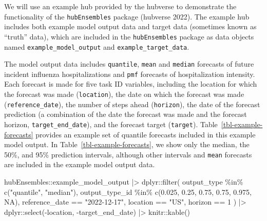 \documentclass[
]{article}
\newenvironment{Shaded}{\begin{snugshade}}{\end{snugshade}}
\newcommand{\ConstantTok}[1]{\textcolor[rgb]{0.56,0.35,0.01}{#1}}
\newcommand{\DecValTok}[1]{\textcolor[rgb]{0.68,0.00,0.00}{#1}}
\newcommand{\FloatTok}[1]{\textcolor[rgb]{0.68,0.00,0.00}{#1}}
\newcommand{\FunctionTok}[1]{\textcolor[rgb]{0.28,0.35,0.67}{#1}}
\newcommand{\NormalTok}[1]{\textcolor[rgb]{0.00,0.23,0.31}{#1}}
\newcommand{\SpecialCharTok}[1]{\textcolor[rgb]{0.37,0.37,0.37}{#1}}
\newcommand{\StringTok}[1]{\textcolor[rgb]{0.13,0.47,0.30}{#1}}
\begin{document}
We will use an example hub provided by the hubverse to demonstrate the
functionality of the \texttt{hubEnsembles} package (hubverse 2022). The
example hub includes both example model output data and target data
(sometimes known as ``truth'' data), which are included in the
\texttt{hubEnsembles} package as data objects named
\texttt{example\_model\_output} and \texttt{example\_target\_data}.

The model output data includes \texttt{quantile}, \texttt{mean} and
\texttt{median} forecasts of future incident influenza hospitalizations
and \texttt{pmf} forecasts of hospitalization intensity. Each forecast
is made for five task ID variables, including the location for which the
forecast was made (\texttt{location}), the date on which the forecast
was made (\texttt{reference\_date}), the number of steps ahead
(\texttt{horizon}), the date of the forecast prediction (a combination
of the date the forecast was made and the forecast horizon,
\texttt{target\_end\_date}), and the forecast target (\texttt{target}).
Table~\ref{tbl-example-forecasts} provides an example set of quantile
forecasts included in this example model output. In
Table~\ref{tbl-example-forecasts}, we show only the median, the 50\%,
and 95\% prediction intervals, although other intervals and
\texttt{mean} forecasts are included in the example model output data.

\begin{Shaded}
\begin{Highlighting}[]
\NormalTok{hubEnsembles}\SpecialCharTok{::}\NormalTok{example\_model\_output }\SpecialCharTok{|\textgreater{}}
\NormalTok{  dplyr}\SpecialCharTok{::}\FunctionTok{filter}\NormalTok{(}
\NormalTok{    output\_type }\SpecialCharTok{\%in\%} \FunctionTok{c}\NormalTok{(}\StringTok{"quantile"}\NormalTok{, }\StringTok{"median"}\NormalTok{),}
\NormalTok{    output\_type\_id }\SpecialCharTok{\%in\%} \FunctionTok{c}\NormalTok{(}\FloatTok{0.025}\NormalTok{, }\FloatTok{0.25}\NormalTok{, }\FloatTok{0.75}\NormalTok{, }\FloatTok{0.75}\NormalTok{, }\FloatTok{0.975}\NormalTok{, }\ConstantTok{NA}\NormalTok{),}
\NormalTok{    reference\_date }\SpecialCharTok{==} \StringTok{"2022{-}12{-}17"}\NormalTok{,}
\NormalTok{    location }\SpecialCharTok{==} \StringTok{"US"}\NormalTok{,}
\NormalTok{    horizon }\SpecialCharTok{==} \DecValTok{1}
\NormalTok{  ) }\SpecialCharTok{|\textgreater{}}
\NormalTok{  dplyr}\SpecialCharTok{::}\FunctionTok{select}\NormalTok{(}\SpecialCharTok{{-}}\NormalTok{location, }\SpecialCharTok{{-}}\NormalTok{target\_end\_date) }\SpecialCharTok{|\textgreater{}}
\NormalTok{  knitr}\SpecialCharTok{::}\FunctionTok{kable}\NormalTok{()}
\end{Highlighting}
\end{Shaded}
\end{document}
